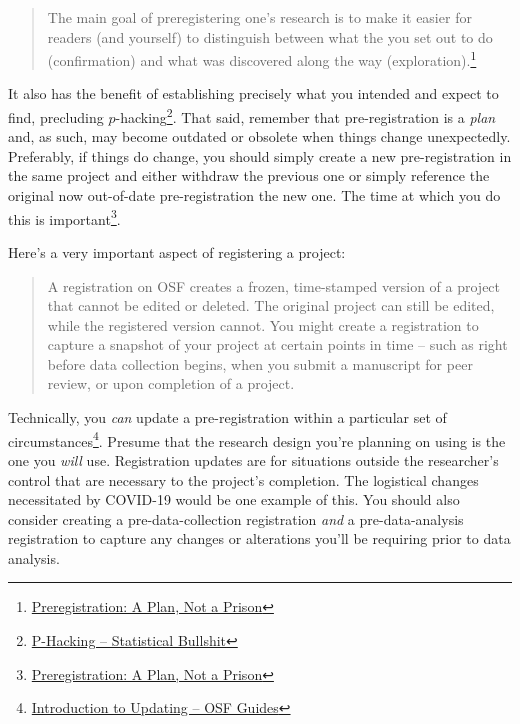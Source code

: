 \documentclass[
]{book}
\begin{document}
\begin{quote}
The main goal of preregistering one's research is to make it easier for readers (and yourself) to distinguish between what the you set out to do (confirmation) and what was discovered along the way (exploration).\footnote{\href{https://www.cos.io/blog/preregistration-plan-not-prison}{Preregistration: A Plan, Not a Prison}}
\end{quote}

It also has the benefit of establishing precisely what you intended and expect to find, precluding \(p\)-hacking\footnote{\href{https://statisticalbullshit.com/2017/07/17/p-hacking/}{P-Hacking -- Statistical Bullshit}}. That said, remember that pre-registration is a \emph{plan} and, as such, may become outdated or obsolete when things change unexpectedly. Preferably, if things do change, you should simply create a new pre-registration in the same project and either withdraw the previous one or simply reference the original now out-of-date pre-registration the new one. The time at which you do this is important\footnote{\href{https://www.cos.io/blog/preregistration-plan-not-prison}{Preregistration: A Plan, Not a Prison}}.

Here's a very important aspect of registering a project:

\begin{quote}
A registration on OSF creates a frozen, time-stamped version of a project that cannot be edited or deleted. The original project can still be edited, while the registered version cannot. You might create a registration to capture a snapshot of your project at certain points in time -- such as right before data collection begins, when you submit a manuscript for peer review, or upon completion of a project.
\end{quote}

Technically, you \emph{can} update a pre-registration within a particular set of circumstances\footnote{\href{https://help.osf.io/hc/en-us/articles/4414482864663-Introduction-to-Updating-}{Introduction to Updating -- OSF Guides}}. Presume that the research design you're planning on using is the one you \emph{will} use. Registration updates are for situations outside the researcher's control that are necessary to the project's completion. The logistical changes necessitated by COVID-19 would be one example of this. You should also consider creating a pre-data-collection registration \emph{and} a pre-data-analysis registration to capture any changes or alterations you'll be requiring prior to data analysis.
\end{document}
